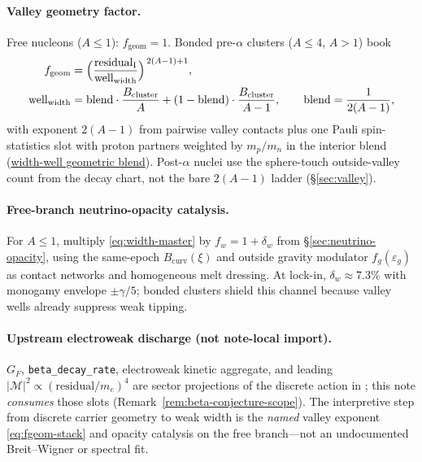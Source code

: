 \documentclass[11pt,notitlepage]{amsart}
\begin{document}
\paragraph{Valley geometry factor.}
Free nucleons ($A\le 1$): $f_{\mathrm{geom}}=1$.
Bonded pre-$\alpha$ clusters ($A\le 4$, $A>1$) book
\begin{align}
  f_{\mathrm{geom}}
    &= \Bigl(\frac{\mathrm{residual}_{\mathrm{I}}}{\mathrm{well}_{\mathrm{width}}}\Bigr)^{\,
        2(A-1)+1},
  \label{eq:fgeom-stack}\\
  \mathrm{well}_{\mathrm{width}}
    &= \mathrm{blend}\cdot\frac{B_{\mathrm{cluster}}}{A}
      + (1-\mathrm{blend})\cdot\frac{B_{\mathrm{cluster}}}{A-1},
  \qquad
  \mathrm{blend}=\frac{1}{2(A-1)},
  \notag
\end{align}
with exponent $2(A-1)$ from pairwise valley contacts plus one Pauli spin-statistics slot
with proton partners weighted by $m_p/m_n$ in the interior blend
(\hyperref[lean:width-well-geometric-blend]{width-well geometric blend}).
Post-$\alpha$ nuclei use the sphere-touch outside-valley count from the decay chart, not
the bare $2(A-1)$ ladder (\S\ref{sec:valley}).

\paragraph{Free-branch neutrino-opacity catalysis.}
For $A\le 1$, multiply \eqref{eq:width-master} by $f_w=1+\delta_w$ from
\S\ref{sec:neutrino-opacity}, using the same-epoch $B_{\mathrm{curv}}(\xi)$ and outside
gravity modulator $f_g(\varepsilon_g)$ as contact networks and homogeneous melt dressing.
At lock-in, $\delta_w\approx 7.3\%$ with monogamy envelope $\pm\gamma/5$; bonded clusters
shield this channel because valley wells already suppress weak tipping.

\paragraph{Upstream electroweak discharge (not note-local import).}
$G_F$, \texttt{beta\_decay\_rate}, electroweak kinetic aggregate, and leading
$|\mathcal{M}|^2\propto(\mathrm{residual}/m_e)^4$ are sector projections of the discrete
action in \cite{hqiv-tuft-sm-lagrangian-paper}; this note \emph{consumes} those slots
(Remark~\ref{rem:beta-conjecture-scope}). The interpretive step from discrete carrier
geometry to weak width is the \emph{named} valley exponent \eqref{eq:fgeom-stack} and
opacity catalysis on the free branch---not an undocumented Breit--Wigner or spectral fit.
\end{document}
